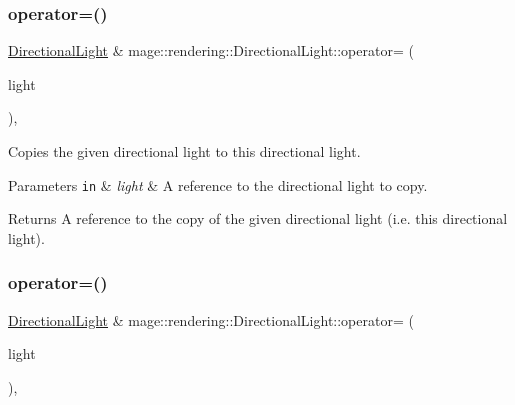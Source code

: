 \subsubsection{\texorpdfstring{operator=()}{operator=()}\hspace{0.1cm}{\footnotesize\ttfamily [1/2]}}
{\footnotesize\ttfamily \mbox{\hyperlink{classmage_1_1rendering_1_1_directional_light}{Directional\+Light}} \& mage\+::rendering\+::\+Directional\+Light\+::operator= (\begin{DoxyParamCaption}\item[{const \mbox{\hyperlink{classmage_1_1rendering_1_1_directional_light}{Directional\+Light}} \&}]{light }\end{DoxyParamCaption})\hspace{0.3cm}{\ttfamily [default]}, {\ttfamily [noexcept]}}

Copies the given directional light to this directional light.


\begin{DoxyParams}[1]{Parameters}
\mbox{\tt in}  & {\em light} & A reference to the directional light to copy. \\
\hline
\end{DoxyParams}
\begin{DoxyReturn}{Returns}
A reference to the copy of the given directional light (i.\+e. this directional light). 
\end{DoxyReturn}
\mbox{\label{classmage_1_1rendering_1_1_directional_light_abcb7fb355a9d3004fd2f9b597b6166d2}} 
\subsubsection{\texorpdfstring{operator=()}{operator=()}\hspace{0.1cm}{\footnotesize\ttfamily [2/2]}}
{\footnotesize\ttfamily \mbox{\hyperlink{classmage_1_1rendering_1_1_directional_light}{Directional\+Light}} \& mage\+::rendering\+::\+Directional\+Light\+::operator= (\begin{DoxyParamCaption}\item[{\mbox{\hyperlink{classmage_1_1rendering_1_1_directional_light}{Directional\+Light}} \&\&}]{light }\end{DoxyParamCaption})\hspace{0.3cm}{\ttfamily [default]}, {\ttfamily [noexcept]}}

